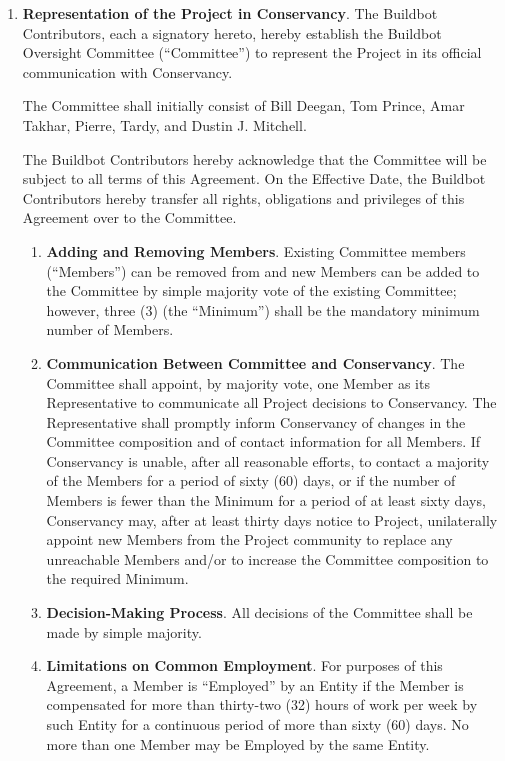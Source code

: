 \documentclass[letterpaper,12pt]{article}
\begin{document}
\begin{enumerate}[label=\arabic*.,ref=\S~\arabic*]
\item \textbf{Representation of the Project in Conservancy}. \label{Representation}
The
Buildbot Contributors, each a signatory hereto, hereby establish
the Buildbot Oversight Committee (``Committee'')
to represent the Project in its official communication with Conservancy.

The Committee shall initially consist of Bill Deegan, Tom Prince, Amar 
Takhar, Pierre, Tardy, and Dustin J. Mitchell.

The Buildbot Contributors hereby acknowledge that the Committee
will be subject to all terms of this Agreement.
On the Effective Date, the Buildbot Contributors hereby transfer all
rights, obligations and privileges of this Agreement over to the
Committee.

\begin{enumerate}[label=\alph*.,ref=\theenumi(\alph*)]

\item \textbf{Adding and Removing Members}.
Existing Committee members (``Members'') can be removed from and new Members
can be added to the Committee by simple majority vote of the existing
Committee; however, three (3) (the ``Minimum'') shall be the mandatory
minimum number of Members.

\item \textbf{Communication Between Committee and Conservancy}. The
Committee shall appoint, by majority vote, one Member as its Representative
to communicate all Project decisions to Conservancy. The Representative
shall promptly inform Conservancy of changes in the Committee composition
and of contact information for all Members. If Conservancy is unable,
after all reasonable efforts, to contact a majority of the Members
for a period of sixty (60) days, or if the number of Members is fewer
than the Minimum for a period of at least sixty days, Conservancy
may, after at least thirty days notice to Project, unilaterally appoint
new Members from the Project community to replace any unreachable
Members and/or to increase the Committee composition to the required
Minimum.

\item \textbf{Decision-Making Process}.
All decisions of the Committee shall be made by simple majority.

\item \textbf{Limitations on Common Employment}.
For purposes of this Agreement, a Member is ``Employed'' by an Entity
if the Member is compensated for more than thirty-two (32) hours of
work per week by such Entity for a continuous period of more than
sixty (60) days. No more than one Member may be Employed by the same
Entity.


\end{enumerate}
\end{enumerate}
\end{document}
